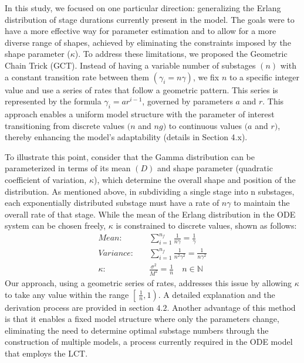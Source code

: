 \documentclass[12pt]{article}
\begin{document}
In this study, we focused on one particular direction: generalizing the Erlang distribution of stage durations currently present in the model. The goals were to have a more effective way for parameter estimation and to allow for a more diverse range of shapes, achieved by eliminating the constraints imposed by the shape parameter ($\kappa$). To address these limitations, we proposed the Geometric Chain Trick (GCT). Instead of having a variable number of substages $(n)$ with a constant transition rate between them $(\gamma_i = n\gamma)$, we fix $n$ to a specific integer value and use a series of rates that follow a geometric pattern. This series is represented by the formula $\gamma_i = ar^{i-1}$, governed by parameters $a$ and $r$. This approach enables a uniform model structure with the parameter of interest transitioning from discrete values $(n$ and $ng)$ to continuous values $(a$ and $r)$, thereby enhancing the model's adaptability (details in Section 4.x).

To illustrate this point, consider that the Gamma distribution can be parameterized in terms of its mean $(D)$ and shape parameter (quadratic coefficient of variation, $\kappa$), which determine the overall shape and position of the distribution. As mentioned above, in subdividing a single stage into n substages, each exponentially distributed substage must have a rate of $n\gamma$ to maintain the overall rate of that stage. While the mean of the Erlang distribution in the ODE system can be chosen freely, $\kappa$ is constrained to discrete values, shown as follows:
\begin{align*}
    Mean: \quad &\sum_{i=1}^{n_f} \frac{1}{n\gamma} = \frac{1}{\gamma}\\
    Variance: \quad &\sum_{i=1}^{n_f} \frac{1}{n^2\gamma^2} = \frac{1}{n\gamma^2} \\
    \kappa: \quad &\frac{\sigma^2}{M^2} = \frac{1}{n} \quad n \in \mathbb{N}
\end{align*}
Our approach, using a geometric series of rates, addresses this issue by allowing $\kappa$ to take any value within the range $\left[\ \frac{1}{n}, 1 \right)$. A detailed explanation and the derivation process are provided in section $4.2$. Another advantage of this method is that it enables a fixed model structure where only the parameters change, eliminating the need to determine optimal substage numbers through the construction of multiple models, a process currently required in the ODE model that employs the LCT.
\end{document}
